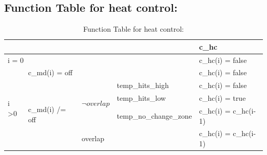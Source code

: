 \documentclass[fontsize=12pt,paper=letter,twoside]{scrartcl}
\begin{document}
\subsection{Function Table for heat control: }
\begin{table}[]
\centering
\begin{tabular}{llll|l|}
\cline{5-5}
                                                        &                                                       &                                                                        &                        & c\_hc                 \\ \hline
\multicolumn{4}{|l|}{i = 0}                                                                                                                                                                                       & c\_hc(i) = false      \\ \hline
\multicolumn{1}{|l|}{\multirow{5}{*}{i \textgreater 0}} & \multicolumn{3}{l|}{c\_md(i) = off}                                                                                                                     & c\_hc(i) = false      \\ \cline{2-5} 
\multicolumn{1}{|l|}{}                                  & \multicolumn{1}{l|}{\multirow{4}{*}{c\_md(i) /= off}} & \multicolumn{1}{l|}{\multirow{3}{*}{$\neg overlap$ \footnotemark}} & temp\_hits\_high \footnotemark      & c\_hc(i) = false      \\ \cline{4-5} 
\multicolumn{1}{|l|}{}                                  & \multicolumn{1}{l|}{}                                 & \multicolumn{1}{l|}{}                                                  & temp\_hits\_low \footnotemark       & c\_hc(i) = true       \\ \cline{4-5} 
\multicolumn{1}{|l|}{}                                  & \multicolumn{1}{l|}{}                                 & \multicolumn{1}{l|}{}                                                  & temp\_no\_change\_zone \footnotemark & c\_hc(i) = c\_hc(i-1) \\ \cline{3-5} 
\multicolumn{1}{|l|}{}                                  & \multicolumn{1}{l|}{}                                 & \multicolumn{2}{l|}{overlap}                                               & c\_hc(i) = c\_hc(i-1) \\ \hline
\end{tabular}
\caption{Function Table for heat control: }
\label{fthcl}
\end{table}
\end{document}
